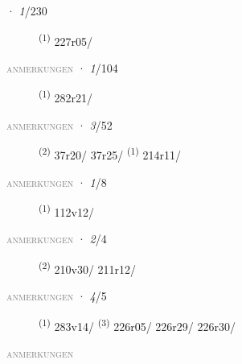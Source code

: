 \noindent{} · \textit{1}/230 \LEMMALINE
\begin{description}
    \item[]  \textsuperscript{(1)} \mbox{227r05/}
\end{description}
\textsc{\textcolor{gray}{anmerkungen}}
\ENTRYEND
\noindent{} · \textit{1}/104 \LEMMALINE
\begin{description}
    \item[]  \textsuperscript{(1)} \mbox{282r21/}
\end{description}
\textsc{\textcolor{gray}{anmerkungen}}
\ENTRYEND
\noindent{} · \textit{3}/52 \LEMMALINE
\begin{description}
    \item[]  \textsuperscript{(2)} \mbox{37r20/} \mbox{37r25/} \textsuperscript{(1)} \mbox{214r11/}
\end{description}
\textsc{\textcolor{gray}{anmerkungen}}
\ENTRYEND
\noindent{} · \textit{1}/8 \LEMMALINE
\begin{description}
    \item[]  \textsuperscript{(1)} \mbox{112v12/}
\end{description}
\textsc{\textcolor{gray}{anmerkungen}}
\ENTRYEND
\noindent{} · \textit{2}/4 \LEMMALINE
\begin{description}
    \item[]  \textsuperscript{(2)} \mbox{210v30/} \mbox{211r12/}
\end{description}
\textsc{\textcolor{gray}{anmerkungen}}
\ENTRYEND
\noindent{} · \textit{4}/5 \LEMMALINE
\begin{description}
    \item[]  \textsuperscript{(1)} \mbox{283v14/} \CASEBREAK {} \textsuperscript{(3)} \mbox{226r05/} \mbox{226r29/} \mbox{226r30/}
\end{description}
\textsc{\textcolor{gray}{anmerkungen}}
\ENTRYEND
